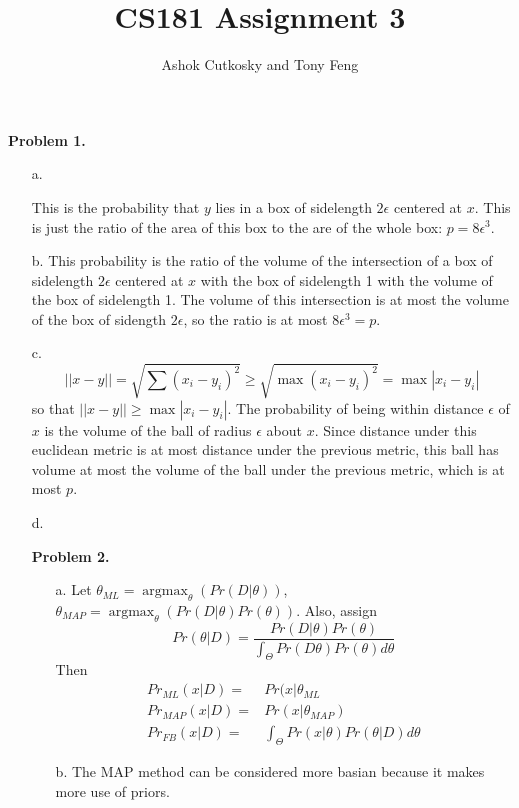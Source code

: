 \documentclass[12pt]{amsart}
\title{CS181 Assignment 3}
\author{Ashok Cutkosky and Tony Feng}
\DeclareMathOperator{\argmax}{argmax}
\theoremstyle{remark}
\begin{document}
\maketitle

\noindent \textbf{Problem 1.}
\begin{enumerate}

\item[a.]

This is the probability that $y$ lies in a box of sidelength $2\epsilon$ centered at $x$. This is just the ratio of the area of this box to the are of the whole box: $p=8\epsilon^3$.


\item[b.]
This probability is the ratio of the volume of the intersection of a box of sidelength $2\epsilon$ centered at $x$ with the box of sidelength 1 with the volume of the box of sidelength 1. The volume of this intersection is at most the volume of the box of sidength $2\epsilon$, so the ratio is at most $8\epsilon^3=p$.

\item[c.]
\[
||x-y||=\sqrt{\sum (x_i-y_i)^2}\ge \sqrt{\max (x_i-y_i)^2}=\max |x_i-y_i|
\]
so that $||x-y||\ge \max |x_i-y_i|$. The probability of being within distance $\epsilon$ of $x$ is the volume of the ball of radius $\epsilon$ about $x$. Since distance under this euclidean metric is at most distance under the previous metric, this ball has volume at most the volume of the ball under the previous metric, which is at most $p$.

\item[d.]


\noindent \textbf{Problem 2.}

\begin{enumerate}
\item[a.]
Let $\theta_{ML} = \argmax_{\theta}(Pr(D|\theta))$, $\theta_{MAP}=\argmax_{\theta}(Pr(D|\theta)Pr(\theta))$. Also, assign
\[
Pr(\theta|D) = \frac{Pr(D|\theta)Pr(\theta)}{\int_{\Theta} Pr(D\theta)Pr(\theta)d\theta}
\]
Then
\begin{align*}
Pr_{ML}(x|D) =& Pr(x|\theta_{ML}\\
Pr_{MAP}(x|D) = & Pr(x|\theta_{MAP})\\
Pr_{FB}(x|D) = & \int_{\Theta} Pr(x|\theta)Pr(\theta|D) d\theta
\end{align*}


\item[b.]
The MAP method can be considered more basian because it makes more use of priors.


\end{enumerate}
\end{enumerate}
\end{document}
